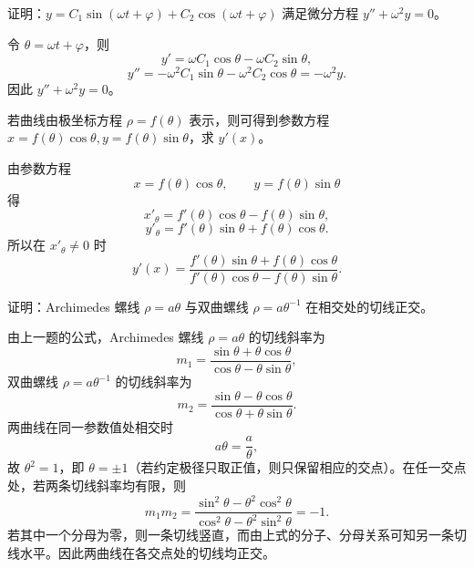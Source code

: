 \begin{xexercise}[7]
证明：$y=C_1\sin(\omega t+\varphi)+C_2\cos(\omega t+\varphi)$ 满足微分方程 $y''+\omega^2y=0$。
\end{xexercise}
\begin{xsolution}
令 $\theta=\omega t+\varphi$，则
\[
  y'=\omega C_1\cos\theta-\omega C_2\sin\theta,
\]
\[
  y''=-\omega^2C_1\sin\theta-\omega^2C_2\cos\theta=-\omega^2y.
\]
因此 $y''+\omega^2y=0$。
\end{xsolution}


\begin{xexercise}[8]
若曲线由极坐标方程 $\rho=f(\theta)$ 表示，则可得到参数方程 $x=f(\theta)\cos\theta,y=f(\theta)\sin\theta$，求 $y'(x)$。
\end{xexercise}
\begin{xsolution}
由参数方程
\[
  x=f(\theta)\cos\theta,\qquad y=f(\theta)\sin\theta
\]
得
\[
  x'_\theta=f'(\theta)\cos\theta-f(\theta)\sin\theta,
\]
\[
  y'_\theta=f'(\theta)\sin\theta+f(\theta)\cos\theta.
\]
所以在 $x'_\theta\ne0$ 时
\[
  \boxed{y'(x)=\frac{f'(\theta)\sin\theta+f(\theta)\cos\theta}{f'(\theta)\cos\theta-f(\theta)\sin\theta}}.
\]
\end{xsolution}


\begin{xexercise}[9]
证明：Archimedes 螺线 $\rho=a\theta$ 与双曲螺线 $\rho=a\theta^{-1}$ 在相交处的切线正交。
\end{xexercise}
\begin{xsolution}
由上一题的公式，Archimedes 螺线 $\rho=a\theta$ 的切线斜率为
\[
  m_1=\frac{\sin\theta+\theta\cos\theta}{\cos\theta-\theta\sin\theta},
\]
双曲螺线 $\rho=a\theta^{-1}$ 的切线斜率为
\[
  m_2=\frac{\sin\theta-\theta\cos\theta}{\cos\theta+\theta\sin\theta}.
\]
两曲线在同一参数值处相交时
\[
  a\theta=\frac a\theta,
\]
故 $\theta^2=1$，即 $\theta=\pm1$（若约定极径只取正值，则只保留相应的交点）。在任一交点处，若两条切线斜率均有限，则
\[
  m_1m_2
  =\frac{\sin^2\theta-\theta^2\cos^2\theta}
  {\cos^2\theta-\theta^2\sin^2\theta}
  =-1.
\]
若其中一个分母为零，则一条切线竖直，而由上式的分子、分母关系可知另一条切线水平。因此两曲线在各交点处的切线均正交。
\end{xsolution}


